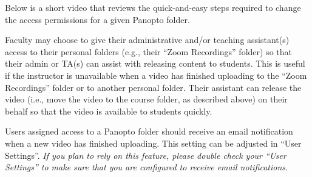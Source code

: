 \begin{gram}
	 Below is a short video that reviews the quick-and-easy steps required to change the access permissions for a given Panopto folder.

\end{gram}

\begin{note}
	Faculty may choose to give their administrative and/or teaching assistant(s) access to their personal folders (e.g., their ``Zoom Recordings'' folder) so that their admin or TA(s) can assist with releasing content to students. This is useful if the instructor is unavailable when a video has finished uploading to the ``Zoom Recordings'' folder or to another personal folder. Their assistant can release the video (i.e., move the video to the course folder, as described above) on their behalf so that the video is available to students quickly.

	\begin{note}
		Users assigned access to a Panopto folder should receive an email notification when a new video has finished uploading. This setting can be adjusted in ``User Settings''. \textit{If you plan to rely on this feature, please double check your ``User Settings'' to make sure that you are configured to receive email notifications.}
	\end{note}
\end{note}
